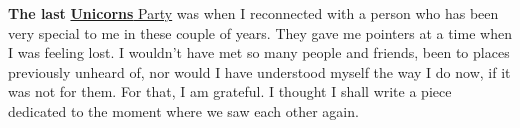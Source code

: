 \documentclass{article}
\begin{document}
\textbf{The last}
\href{https://www.unicornsparty.com/}{\textbf{Unicorns} Party} was when
I reconnected with a person who has been very special to me in these
couple of years.  They gave me pointers at a time when I was feeling
lost. I wouldn't have met so many people and friends, been to places
previously unheard of, nor would I have understood myself the way I do
now, if it was not for them. For that, I am grateful. I thought I shall
write a piece dedicated to the moment where we saw each other again.
\end{document}
